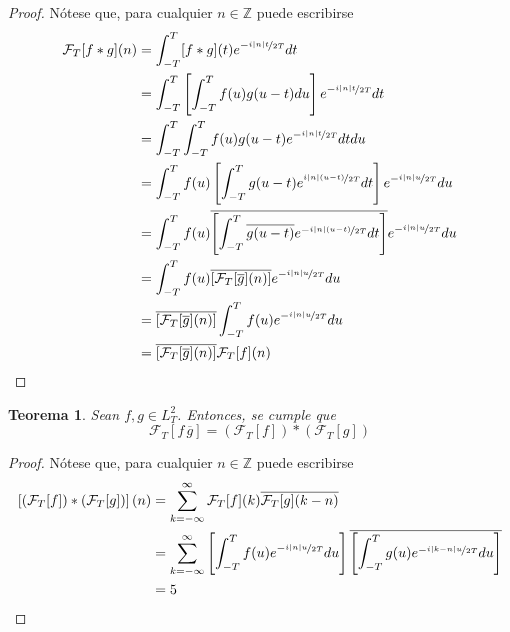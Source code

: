 \documentclass[12pt,letterpaper,draft]{book}
\newtheorem{teorema}{Teorema}[chapter]
\newcommand{\Z}{\mathbb{Z}}
\newcommand{\simint}[1]{\int_{- #1 }^{ #1 }}
\newcommand{\abso}[1]{\left| #1 \right|}
\begin{document}
\begin{proof}
Nótese que, para cualquier $n \in \Z$ puede escribirse
\begin{align*}
\mathcal{F}_T[f \ast g] (n)
&= \simint{T} [f\ast g](t) e^{-\nicefrac{ i \abso{n} t}{2T}} dt \\
&= \simint{T} \left[ \simint{T} f(u) g(u-t) du \right] e^{-\nicefrac{ i \abso{n} t}{2T}} dt \\
&= \simint{T} \simint{T} f(u) g(u-t) e^{-\nicefrac{ i \abso{n} t}{2T}} dt du \\
&= \simint{T} f(u) \left[ \simint{T} g(u-t) e^{\nicefrac{ i \abso{n} (u-t)}{2T}} dt \right] e^{-\nicefrac{ i \abso{n} u}{2T}} du \\
&= \simint{T} f(u) \overline{\left[ \simint{T} \overline{g(u-t)} e^{-\nicefrac{ i \abso{n} (u-t)}{2T}} dt \right]} e^{-\nicefrac{ i \abso{n} u}{2T}} du \\
&= \simint{T} f(u) \overline{\left[ \mathcal{F}_T[\overline{g}](n) \right]} e^{-\nicefrac{ i \abso{n} u}{2T}} du \\
&= \overline{\left[ \mathcal{F}_T[\overline{g}](n) \right]} \simint{T} f(u) e^{-\nicefrac{ i \abso{n} u}{2T}} du \\
&= \overline{\left[ \mathcal{F}_T[\overline{g}](n) \right]} \mathcal{F}_T[f] (n)
\end{align*}
\end{proof}

\begin{teorema}
Sean $f, g \in L^{2}_T$. Entonces, se cumple que
\begin{equation}
\mathcal{F}_T[ f\, \overline{g}] = \left( \mathcal{F}_T[f] \right) \ast \left( \mathcal{F}_T[g] \right)
\end{equation}
\end{teorema}

\begin{proof}
Nótese que, para cualquier $n \in \Z$ puede escribirse
\begin{align*}
\left[\left( \mathcal{F}_T[f] \right) \ast \left( \mathcal{F}_T[g] \right)\right](n)
&=
\sum_{k=-\infty}^{\infty} \mathcal{F}_T[f](k) \overline{\mathcal{F}_T[g](k-n)} \\
&=
\sum_{k=-\infty}^{\infty} \left[ \simint{T} f(u) e^{-\nicefrac{ i \abso{n} u}{2T}} du \right] \overline{\left[ \simint{T} g(u) e^{-\nicefrac{ i \abso{k-n} u}{2T}} du \right]} \\
&= 5
\end{align*}
\end{proof}
\end{document}
